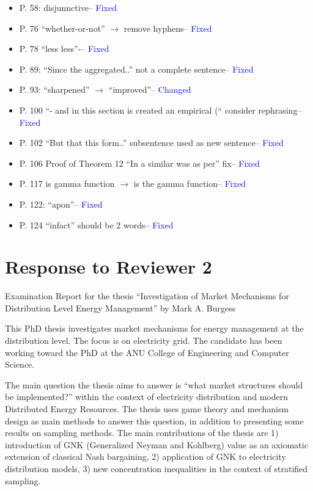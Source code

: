 \documentclass{article}
\begin{document}
\begin{itemize}
\item	P. 58: disjunnctive\textcolor{blue}{-- Fixed}
\item	P. 76 “whether-or-not” $\rightarrow$ remove hyphens\textcolor{blue}{-- Fixed}
\item	P. 78 “less less”-\textcolor{blue}{-- Fixed}
\item	P. 89: “Since the aggregated..” not a complete sentence\textcolor{blue}{-- Fixed}
\item	P. 93: “sharpened” $\rightarrow$ “improved”\textcolor{blue}{-- Changed}
\item	P. 100 “- and in this section is created an empirical (“ consider rephrasing\textcolor{blue}{-- Fixed}
\item	P. 102 “But that this form..” subsentence used as new sentence\textcolor{blue}{-- Fixed}
\item	P. 106 Proof of Theorem 12 “In a similar was as per” fix\textcolor{blue}{-- Fixed}
\item	P. 117 is gamma function $\rightarrow$ is the gamma function\textcolor{blue}{-- Fixed}
\item	P. 122: “apon”\textcolor{blue}{-- Fixed}
\item	P. 124 “infact” should be 2 words\textcolor{blue}{-- Fixed}
\end{itemize}



\section{Response to Reviewer 2}

Examination Report for the thesis “Investigation of Market Mechanisms for Distribution Level Energy Management” by Mark A. Burgess

This PhD thesis investigates market mechanisms for energy management at the distribution
level. The focus is on electricity grid. The candidate has been working toward the PhD at the
ANU College of Engineering and Computer Science.

The main question the thesis aims to answer is “what market structures should be
implemented?” within the context of electricity distribution and modern Distributed Energy
Resources. The thesis uses game theory and mechanism design as main methods to answer
this question, in addition to presenting some results on sampling methods. The main
contributions of the thesis are 1) introduction of GNK (Generalized Neyman and Kohlberg)
value as an axiomatic extension of classical Nash bargaining, 2) application of GNK to
electricity distribution models, 3) new concentration inequalities in the context of stratified
sampling.
\end{document}
